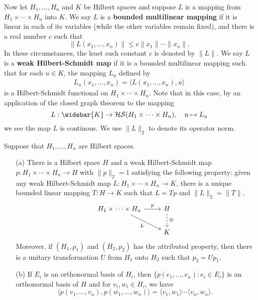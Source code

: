 Now let $H_1,\dots,H_n$ and $K$ be Hilbert spaces and suppose $L$ is a mapping from $H_1\times\cdots\times H_n$ into $K$. We say $L$ is a \textbf{bounded multilinear mapping} if it is linear in each of its variables (while the other variables remain fixed), and there is a real number $c$ such that
\[\|L(x_1,\dots,x_n)\|\leq c\|x_1\|\cdots\|x_n\|.\]
In these circumstances, the least such constant $c$ is denoted by $\|L\|$. We say $L$ is a \textbf{weak Hilbert-Schmidt map} if it is a bounded multilinear mapping such that for each $u\in K$, the mapping $L_u$ defined by
\begin{align}\label{weak Hilbert-Schmidt map def}
L_u(x_1,\dots,x_n)=\langle L(x_1,\dots,x_n),u\rangle
\end{align}
is a Hilbert-Schmidt functional on $H_1\times\cdots\times H_n$. Note that in this case, by an application of the closed graph theorem to the mapping \[L:\widebar{K}\to\mathcal{HS}(H_1\times\cdots\times H_n),\quad u\mapsto L_u\]
we see the map $L$ is continous. We use $\|L\|_2$ to denote its operator norm.
\begin{theorem}\label{Hilbert space tensor product exist and unique}
Suppose that $H_1,\dots,H_n$ are Hilbert spaces.
\begin{itemize}
\item[(a)] There is a Hilbert space $H$ and a weak Hilbert-Schmidt map $p:H_1\times\cdots\times H_n\to H$ with $\|p\|_2=1$ satisfying the following property: given any weak Hilbert-Schmidt map $L:H_1\times\cdots\times H_n\to K$, there is a unique bounded linear mapping $T:H\to K$ such that $L=Tp$ and $\|L\|_2=\|T\|$.
\[\begin{tikzcd}
H_1\times\cdots\times H_n\ar[r,"p"]\ar[rd,swap,"L"]&H\ar[d,dashed,"\exists!"]\\\
&K
\end{tikzcd}\]
Moreover, if $(H_1,p_1)$ and $(H_2,p_2)$ has the attributed property, then there is a unitary transformation $U$ from $H_1$ onto $H_2$ such that $p_2=Up_1$.
\item[(b)] If $E_i$ is an orthonormal basis of $H_i$, then $\{p(e_1,\dots,e_n):e_i\in E_i\}$ is an orthonormal basis of $H$ and for $v_i,w_i\in H_i$, we have
\[\langle p(v_1,\dots,v_n),p(w_1,\dots,w_n)\rangle=\langle v_1,w_1\rangle\cdots\langle v_n,w_n\rangle.\] 
\end{itemize}
\end{theorem}
